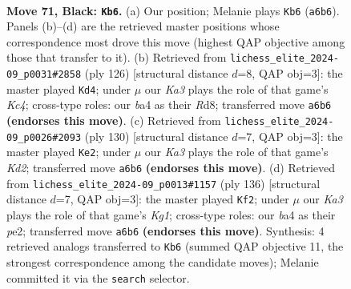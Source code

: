 \documentclass[11pt]{article}
\begin{document}
\clearpage

\begin{figure}[p]\centering
\begin{subfigure}{0.46\textwidth}\centering
\resizebox{\linewidth}{!}{%
\newchessgame
\chessboard[
  setfen={8/5R2/k4P2/8/B7/8/5K1P/8 b - - 0 71},
  showmover=false,
  pgfstyle=straightmove, color=movearrow, markmove={a6-b6}
]}
\caption{}
\end{subfigure}\hfill
\begin{subfigure}{0.46\textwidth}\centering
\resizebox{\linewidth}{!}{%
\newchessgame
\chessboard[
  setfen={3R4/8/8/5k2/2K3p1/6r1/8/8 w - - 0 64},
  showmover=false,
  pgfstyle=straightmove, color=movearrow, markmove={c4-d4}
]}
\caption{}
\end{subfigure}
\\[4pt]
\begin{subfigure}{0.46\textwidth}\centering
\resizebox{\linewidth}{!}{%
\newchessgame
\chessboard[
  setfen={8/8/8/8/3k4/8/1p1K4/1r6 w - - 0 66},
  showmover=false,
  pgfstyle=straightmove, color=movearrow, markmove={d2-e2}
]}
\caption{}
\end{subfigure}\hfill
\begin{subfigure}{0.46\textwidth}\centering
\resizebox{\linewidth}{!}{%
\newchessgame
\chessboard[
  setfen={8/8/4p3/8/5k2/2p5/2r1p3/6K1 w - - 0 69},
  showmover=false,
  pgfstyle=straightmove, color=movearrow, markmove={g1-f2}
]}
\caption{}
\end{subfigure}
\caption{\textbf{Move 71, Black: \texttt{Kb6}.} (a) Our position; Melanie plays \texttt{Kb6} (\texttt{a6b6}). Panels (b)--(d) are the retrieved master positions whose correspondence most drove this move (highest QAP objective among those that transfer to it). (b) Retrieved from \texttt{lichess\_elite\_2024-09\_p0031\#2858} (ply 126) [structural distance $d$=8, QAP obj=3]: the master played \texttt{Kd4}; under $\mu$ our \emph{Ka3} plays the role of that game's \emph{Kc4}; cross-type roles: our \emph{b}a4 as their \emph{R}d8; transferred move \texttt{a6b6} \textbf{(endorses this move)}. (c) Retrieved from \texttt{lichess\_elite\_2024-09\_p0026\#2093} (ply 130) [structural distance $d$=7, QAP obj=3]: the master played \texttt{Ke2}; under $\mu$ our \emph{Ka3} plays the role of that game's \emph{Kd2}; transferred move \texttt{a6b6} \textbf{(endorses this move)}. (d) Retrieved from \texttt{lichess\_elite\_2024-09\_p0013\#1157} (ply 136) [structural distance $d$=7, QAP obj=3]: the master played \texttt{Kf2}; under $\mu$ our \emph{Ka3} plays the role of that game's \emph{Kg1}; cross-type roles: our \emph{b}a4 as their \emph{p}e2; transferred move \texttt{a6b6} \textbf{(endorses this move)}. Synthesis: 4 retrieved analogs transferred to \texttt{Kb6} (summed QAP objective 11, the strongest correspondence among the candidate moves); Melanie committed it via the \texttt{search} selector.}
\label{fig:thought-m141}
\end{figure}
\end{document}
